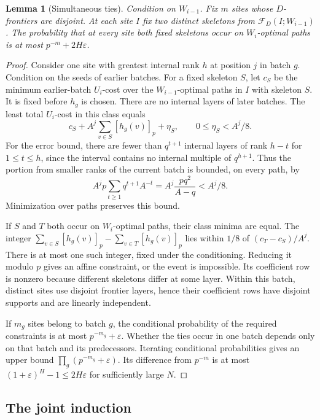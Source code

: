 \documentclass[11pt]{article}
\newtheorem{lemma}[theorem]{Lemma}
\newcommand{\calF}{\mathcal F}
\begin{document}
\begin{lemma}[Simultaneous ties]\label{lem:ties}
Condition on $W_{i-1}$. Fix $m$ sites whose $D$-frontiers are disjoint.
At each site $I$ fix two distinct skeletons from $\calF_D(I;W_{i-1})$.
The probability that at every site both fixed skeletons occur on
$W_i$-optimal paths is at most $p^{-m}+2H\varepsilon$.
\end{lemma}
\begin{proof}
Consider one site with greatest internal rank $h$ at position $j$ in
batch $g$. Condition on the seeds of earlier batches. For a fixed
skeleton $S$, let $c_S$ be the minimum earlier-batch $U_i$-cost over
the $W_{i-1}$-optimal paths in $I$ with skeleton $S$.
It is fixed before $h_g$ is chosen. There are no internal layers of
later batches. The least total $U_i$-cost in this class equals
\[
      c_S + A^j \sum_{v\in S}[h_g(v)]_p+\eta_S,
                         \qquad 0\le\eta_S<A^j/8 .
\]
For the error bound, there are fewer than $q^{t+1}$ internal layers
of rank $h-t$ for $1\le t\le h$, since the interval contains no internal
multiple of $q^{h+1}$. Thus the portion from smaller ranks of the
current batch is bounded, on every path, by
\[
    A^j p\sum_{t\ge1} q^{t+1} A^{-t}
      = A^j \frac{p q^2}{A-q}<A^j/8 .
\]
Minimization over paths preserves this bound.

If $S$ and $T$ both occur on $W_i$-optimal paths, their class minima
are equal. The integer $\sum_{v\in S}[h_g(v)]_p-\sum_{v\in T}[h_g(v)]_p$
lies within $1/8$ of $(c_T-c_S)/A^j$. There is at most one such integer,
fixed under the conditioning. Reducing it modulo $p$ gives an affine
constraint, or the event is impossible. Its coefficient row is nonzero
because different skeletons differ at some layer. Within this batch,
distinct sites use disjoint frontier layers, hence their coefficient
rows have disjoint supports and are linearly independent.

If $m_g$ sites belong to batch $g$, the conditional probability of the
required constraints is at most $p^{-m_g}+\varepsilon$. Whether the ties
occur in one batch depends only on that batch and its predecessors.
Iterating conditional probabilities gives an upper bound
$\prod_g(p^{-m_g}+\varepsilon)$. Its difference from $p^{-m}$ is at most
$(1+\varepsilon)^H-1\le2H\varepsilon$ for sufficiently large $N$.
\end{proof}

\subsection{The joint induction}
\end{document}

